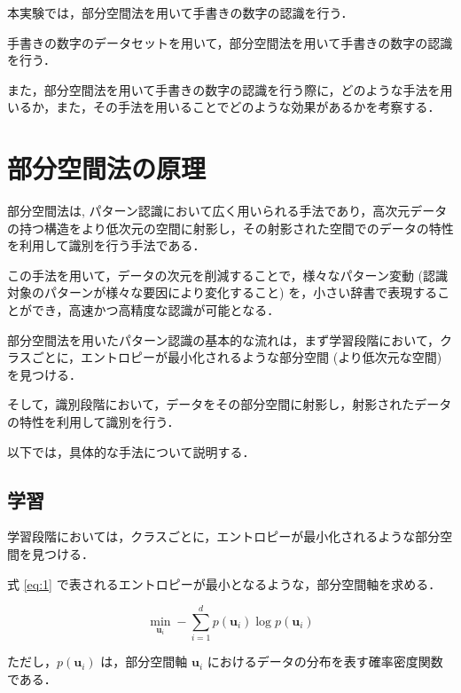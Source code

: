 \documentclass[fleqn, a4paper. 12pt]{jsarticle}
\begin{document}
    本実験では，部分空間法を用いて手書きの数字の認識を行う．

    手書きの数字のデータセットを用いて，部分空間法を用いて手書きの数字の認識を行う．

    また，部分空間法を用いて手書きの数字の認識を行う際に，どのような手法を用いるか，また，その手法を用いることでどのような効果があるかを考察する．

  \section{部分空間法の原理}

    部分空間法は, パターン認識において広く用いられる手法であり，高次元データの持つ構造をより低次元の空間に射影し，その射影された空間でのデータの特性を利用して識別を行う手法である．

    この手法を用いて，データの次元を削減することで，様々なパターン変動 (認識対象のパターンが様々な要因により変化すること) を，小さい辞書で表現することができ，高速かつ高精度な認識が可能となる．

    部分空間法を用いたパターン認識の基本的な流れは，まず学習段階において，クラスごとに，エントロピーが最小化されるような部分空間 (より低次元な空間) を見つける．

    そして，識別段階において，データをその部分空間に射影し，射影されたデータの特性を利用して識別を行う．

    以下では，具体的な手法について説明する．



    \subsection{学習}

        学習段階においては，クラスごとに，エントロピーが最小化されるような部分空間を見つける．
    
        式 \ref{eq:1} で表されるエントロピーが最小となるような，部分空間軸を求める．

        \begin{equation}
            \min _{\boldsymbol{u}_i}-\sum_{i=1}^d p\left(\boldsymbol{u}_i\right) \log p\left(\boldsymbol{u}_i\right)
            \label{eq:1}
        \end{equation}

        ただし，$p\left(\boldsymbol{u}_i\right)$ は，部分空間軸 $\boldsymbol{u}_i$ におけるデータの分布を表す確率密度関数である．

        \quad
\end{document}
